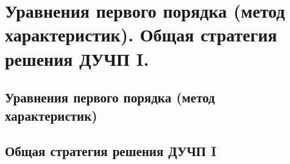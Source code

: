 \chapter{Уравнения первого порядка (метод характеристик). Общая стратегия
решения ДУЧП I.}

\section{Уравнения первого порядка (метод характеристик)}
\section{Общая стратегия решения ДУЧП I}
\newpage
